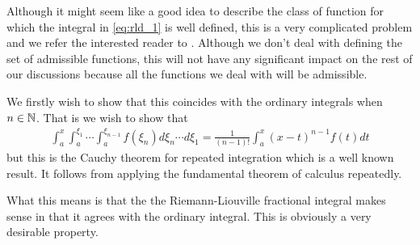Although it might seem like a good idea to describe the class of function for which the integral in \eqref{eq:rld_1} is well defined, this is a very complicated problem and we refer the interested reader to \cite{Samko1993}. Although we don't deal with defining the set of admissible functions, this will not have any significant impact on the rest of our discussions because all the functions we deal with will be admissible. 

We firstly wish to show that this coincides with the ordinary integrals when $ n \in \mathbb{N} $. 
That is we wish to show that 
\begin{align}
    \int_a^x \int_a^{\xi_1} \cdots \int_a^{\xi_{n-1}} f(\xi_n) d\xi_n\cdots d\xi_1 = \frac{1}{(n-1)!} \int_a^x (x-t)^{n-1}f(t)dt
\end{align}
but this is the Cauchy theorem for repeated integration which is a well known result. It follows from applying the fundamental theorem of calculus repeatedly. 

What this means is that the the Riemann-Liouville fractional integral makes sense in that it agrees with the ordinary integral. This is obviously a very desirable property. 

